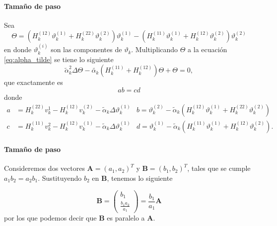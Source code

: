 \begin{frame}{\insertsectionhead}
    \framesubtitle{Tamaño de paso}
    \vspace{-0.4cm}
    Sea
    \begin{equation*}
        \Theta = \left(H_k^{(12)}\vartheta_k^{(1)}+ H_k^{(22)}\vartheta^{(2)}_k\right)\vartheta_k^{(1)} -  \left(H_k^{(11)}\vartheta_k^{(1)}+ H_k^{(12)}\vartheta^{(2)}_k\right)\vartheta_k^{(2)}
    \end{equation*}
    en donde $\vartheta_k^{(i)}$ son las componentes de $\vartheta_k$. Multiplicando $\Theta$ a la ecuación \ref{eq:alpha_tilde} se tiene lo siguiente
    \begin{equation*}
        \tilde{\alpha}_k^2\Delta\Theta-\tilde{\alpha_k}\left(H_k^{(11)}+H_k^{(12)}\right)\Theta + \Theta = 0,
    \end{equation*}
    que exactamente es
    \begin{equation*}
        ab =cd
    \end{equation*}
    donde
    \begin{align*}
        a & = H_k^{(22)}v_k^{1}-H_k^{(12)}v_k^{(2)}-\tilde{\alpha}_k\Delta\vartheta_k^{(1)} & b  = \vartheta_k ^{(2)}-\tilde{\alpha}_k(H_k^{(12)}\vartheta_k^{(1)}+H_k^{(22)}\vartheta_k^{(2)})  \\
        c & = H_k^{(11)}v_k^{2}-H_k^{(12)}v_k^{(1)}-\tilde{\alpha}_k\Delta\vartheta_k^{(1)} & d  = \vartheta_k ^{(1)}-\tilde{\alpha}_k(H_k^{(11)}\vartheta_k^{(1)}+H_k^{(12)}\vartheta_k^{(2)}).
    \end{align*}
\end{frame}

\begin{frame}{\insertsectionhead}
    \framesubtitle{Tamaño de paso}
    Consideremos dos vectores $\boldsymbol{A} = (a_1, a_2)^T$ y $\boldsymbol{B} = (b_1, b_2)^T$, tales que se cumple $a_1b_2 = a_2b_1$. Sustituyendo $b_2$ en $\boldsymbol{B}$, tenemos lo siguiente

    \begin{equation*}
        \boldsymbol{B} = \begin{pmatrix}
            b_1 \\
            \frac{b_1a_2}{a_1}
        \end{pmatrix} = \frac{b_1}{a_1}\boldsymbol{A}
    \end{equation*}
    por los que podemos decir que $\boldsymbol{B}$ es paralelo a $\boldsymbol{A}$.
\end{frame}

